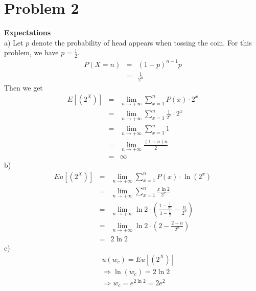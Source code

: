 \documentclass[12pt]{article}
\begin{document}
\section*{Problem 2}
{\bf Expectations} \\

a) Let $p$ denote the probability of head appears when tossing the coin. For this problem, we have $p = \frac {1}{2}$. \\
\begin{eqnarray*}
  P(X = n)
  &=& (1-p)^{n-1}p \\
  &=& \frac {1}{2^n}
\end{eqnarray*}
Then we get
\begin{eqnarray*}
  E[(2^X)]
  &=& \lim_{n \rightarrow +\infty} \sum_{x=1}^{n} P(x) \cdot 2^x \\
  &=& \lim_{n \rightarrow +\infty} \sum_{x=1}^{n} \frac {1}{2^x} \cdot 2^x \\
  &=& \lim_{n \rightarrow +\infty} \sum_{x=1}^{n} 1 \\
  &=& \lim_{n \rightarrow +\infty} \frac {(1+n)n}{2} \\
  &=& \infty
\end{eqnarray*}
b)
\begin{eqnarray*}
  Eu[(2^X)]
  &=& \lim_{n \rightarrow +\infty} \sum_{x=1}^{n} P(x) \cdot \ln(2^x) \\
  &=& \lim_{n \rightarrow +\infty} \sum_{x=1}^{n} \frac{x \ln 2}{2^x}\\
  &=& \lim_{n \rightarrow +\infty} \ln 2 \cdot
  (\frac {1 - \frac{1}{2^n}}{1 - \frac{1}{2}} - \frac{n}{2^n}) \\
  &=& \lim_{n \rightarrow +\infty} \ln 2 \cdot (2 - \frac {2+n}{2^n}) \\
  &=& 2\ln 2
\end{eqnarray*}
c)
\begin{eqnarray*}
  && u(w_c) = Eu[(2^X)] \\
  && \Rightarrow \ln (w_c) = 2 \ln 2 \\
  && \Rightarrow w_c = e^{2 \ln 2} = 2e^2
\end{eqnarray*}
\end{document}
